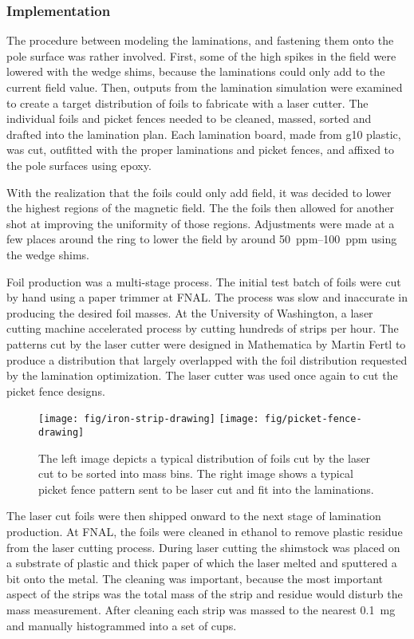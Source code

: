 \subsubsection{Implementation}

The procedure between modeling the laminations, and fastening them onto the pole surface was rather involved.  First, some of the high spikes in the field were lowered with the wedge shims, because the laminations could only add to the current field value.  Then, outputs from the lamination simulation were examined to create a target distribution of foils to fabricate with a laser cutter.  The individual foils and picket fences needed to be cleaned, massed, sorted and drafted into the lamination plan.  Each lamination board, made from g10 plastic, was cut, outfitted with the proper laminations and picket fences, and affixed to the pole surfaces using epoxy.

With the realization that the foils could only add field, it was decided to lower the highest regions of the magnetic field.  The the foils then allowed for another shot at improving the uniformity of those regions.  Adjustments were made at a few places around the ring to lower the field by around \SIrange{50}{100}{ppm} using the wedge shims.

Foil production was a multi-stage process.  The initial test batch of foils were cut by hand using a paper trimmer at FNAL.  The process was slow and inaccurate in producing the desired foil masses.  At the University of Washington, a laser cutting machine accelerated process by cutting hundreds of strips per hour.  The patterns cut by the laser cutter were designed in Mathematica by Martin Fertl to produce a distribution that largely overlapped with the foil distribution requested by the lamination optimization.  The laser cutter was used once again to cut the picket fence designs.

\begin{figure}
\centering
\texttt{[image: fig/iron-strip-drawing]}
\texttt{[image: fig/picket-fence-drawing]}
\caption{
    The left image depicts a typical distribution of foils cut by the laser cut to be sorted into mass bins.  The right image shows a typical picket fence pattern sent to be laser cut and fit into the laminations. 
    \label{fig:laser-cutter-drawings}
}
\end{figure}

The laser cut foils were then shipped onward to the next stage of lamination production.  At FNAL, the foils were cleaned in ethanol to remove plastic residue from the laser cutting process.  During laser cutting the shimstock was placed on a substrate of plastic and thick paper of which the laser melted and sputtered a bit onto the metal.  The cleaning was important, because the most important aspect of the strips was the total mass of the strip and residue would disturb the mass measurement.  After cleaning each strip was massed to the nearest \SI{0.1}{\milli\gram} and manually histogrammed into a set of cups.

